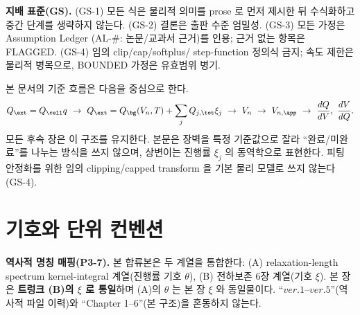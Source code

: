 \begin{groundingbox}
\textbf{지배 표준(GS).} (GS-1) 모든 식은 물리적 의미를 prose 로 먼저 제시한 뒤 수식화하고 중간
단계를 생략하지 않는다. (GS-2) 결론은 출판 수준 엄밀성. (GS-3) 모든 가정은 Assumption Ledger
(AL-\#: 논문/교과서 근거)를 인용; 근거 없는 항목은 FLAGGED. (GS-4) 임의 clip/cap/softplus/
step-function 정의식 금지; 속도 제한은 물리적 병목으로, BOUNDED 가정은 유효범위 병기.
\end{groundingbox}

본 문서의 기준 흐름은 다음을 중심으로 한다.
\begin{equation}
Q_\ext=Q_\cell q
\ \rightarrow\
Q_\ext=Q_\bg(V_n,T)+\sum_j Q_{j,\tot}\xi_j
\ \rightarrow\
V_n
\ \rightarrow\
V_{n,\app}
\ \rightarrow\
\frac{dQ}{dV},\ \frac{dV}{dQ}.
\label{eq:masterflow}
\end{equation}
모든 후속 장은 이 구조를 유지한다. 본문은 장벽을 특정 기준값으로 잘라 ``완료/미완료''를 나누는
방식을 쓰지 않으며, 상변이는 진행률 $\xi_j$ 의 동역학으로 표현한다. 피팅 안정화를 위한 임의
clipping/capped transform 을 기본 물리 모델로 쓰지 않는다(GS-4).


\section{기호와 단위 컨벤션}\label{sec:notation}
\textbf{역사적 명칭 매핑(P3-7).} 본 합류본은 두 계열을 통합한다: (A) relaxation-length spectrum
kernel-integral 계열(진행률 기호 $\theta$), (B) 전하보존 6장 계열(기호 $\xi$). 본 장은 \textbf{트렁크
(B)의 $\xi$ 로 통일}하며 (A)의 $\theta$ 는 본 장 $\xi$ 와 동일물이다. ``$ver.1$--$ver.5$''(역사적 파일
이력)와 ``Chapter 1--6''(본 구조)을 혼동하지 않는다.

